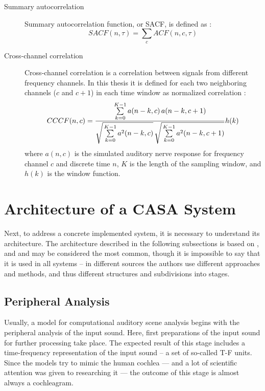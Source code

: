 \begin{description}
	\item[Summary autocorrelation] Summary autocorrelation function, or SACF, is defined as \cite{Wang2006}\cite{Wang2012}:
	\begin{equation}
		SACF(n, \tau) = \sum_c{ACF(n, c, \tau)}
		\label{equation:SACF}
	\end{equation}
	
	\item[Cross-channel correlation] Cross-channel correlation is a correlation between signals from different frequency channels. In this thesis it is defined for each two neighboring channels ($c$ and $c + 1$) in each time window as normalized correlation \cite{Wang2006}\cite{Wang2012}:
	\begin{equation}
		CCCF(n, c) = \frac{
			\sum\limits_{k=0}^{K-1}a(n - k, c)\,a(n - k, c + 1)
		}{
			\sqrt{\strut\sum\limits_{k=0}^{K-1}{a^2(n - k, c)}}\,
			\sqrt{\strut\sum\limits_{k=0}^{K-1}{a^2(n - k, c + 1)}}
		}h(k)
		\label{equation:CCCF}
	\end{equation}
	where $a(n, c)$ is the simulated auditory nerve response for frequency channel $c$ and discrete time $n$, $K$ is the length of the sampling window, and $h(k)$ is the window function.
\end{description}

\section{Architecture of a CASA System}\label{section:casa_architecture}

Next, to address a concrete implemented system, it is necessary to understand its architecture. The architecture described in the following subsections is based on \cite{Wang2006}, \cite{Wang2012} and \cite{Jasti2020} and may be considered the most common, though it is impossible to say that it is used in all systems -- in different sources the authors use different approaches and methods, and thus different structures and subdivisions into stages.

\subsection{Peripheral Analysis}\label{subsection:casa_peripheral_analysis}

Usually, a model for computational auditory scene analysis begins with the peripheral analysis of the input sound. Here, first preparations of the input sound for further processing take place. The expected result of this stage includes a time-frequency representation of the input sound -- a set of so-called T-F units. Since the models try to mimic the human cochlea --- and a lot of scientific attention was given to researching it --- the outcome of this stage is almost always a cochleagram.\\

